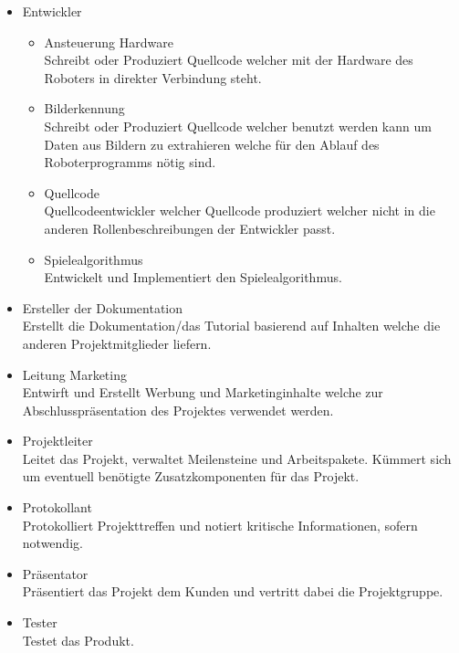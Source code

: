         \begin{itemize}
            \item Entwickler
                \begin{itemize}
                    \item Ansteuerung Hardware \\
                        Schreibt oder Produziert Quellcode welcher mit der
                        Hardware des Roboters in direkter Verbindung steht.

                    \item Bilderkennung \\
                        Schreibt oder Produziert Quellcode welcher benutzt
                        werden kann um Daten aus Bildern zu extrahieren welche
                        für den Ablauf des Roboterprogramms nötig sind.

                    \item Quellcode \\
                        Quellcodeentwickler welcher Quellcode produziert welcher
                        nicht in die anderen Rollenbeschreibungen der Entwickler
                        passt.

                    \item Spielealgorithmus \\
                        Entwickelt und Implementiert den Spielealgorithmus.

                \end{itemize}
            \item Ersteller der Dokumentation \\
                Erstellt die Dokumentation/das Tutorial basierend auf Inhalten
                welche die anderen Projektmitglieder liefern.

            \item Leitung Marketing \\
                Entwirft und Erstellt Werbung und Marketinginhalte welche zur
                Abschlusspräsentation des Projektes verwendet werden.

            \item Projektleiter \\
                Leitet das Projekt, verwaltet Meilensteine und Arbeitspakete.
                Kümmert sich um eventuell benötigte Zusatzkomponenten für das
                Projekt.

            \item Protokollant \\
                Protokolliert Projekttreffen und notiert kritische
                Informationen, sofern notwendig.

            \item Präsentator \\
                Präsentiert das Projekt dem Kunden und vertritt dabei die
                Projektgruppe.

            \item Tester \\
                Testet das Produkt.

        \end{itemize}


